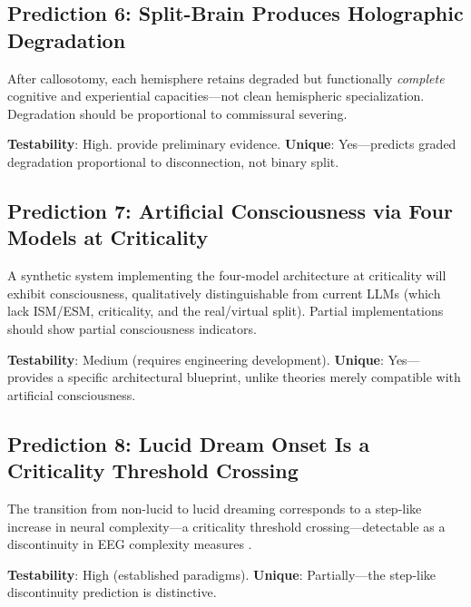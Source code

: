 \documentclass[12pt]{article}
\begin{document}
\subsection{Prediction 6: Split-Brain Produces Holographic Degradation}

After callosotomy, each hemisphere retains degraded but functionally \emph{complete} cognitive and experiential capacities---\hspace{0pt}not clean hemispheric specialization. Degradation should be proportional to commissural severing.

\textbf{Testability}: High. \citet{Pinto2017} provide preliminary evidence. \textbf{Unique}: Yes---\hspace{0pt}predicts graded degradation proportional to disconnection, not binary split.


\subsection{Prediction 7: Artificial Consciousness via Four Models at Criticality}

A synthetic system implementing the four-model architecture at criticality will exhibit consciousness, qualitatively distinguishable from current LLMs (which lack ISM/ESM, criticality, and the real/virtual split). Partial implementations should show partial consciousness indicators.

\textbf{Testability}: Medium (requires engineering development). \textbf{Unique}: Yes---\hspace{0pt}provides a specific architectural blueprint, unlike theories merely compatible with artificial consciousness.


\subsection{Prediction 8: Lucid Dream Onset Is a Criticality Threshold Crossing}

The transition from non-lucid to lucid dreaming corresponds to a step-like increase in neural complexity---\hspace{0pt}a criticality threshold crossing---\hspace{0pt}detectable as a discontinuity in EEG complexity measures \citep{LaBerge1985}.

\textbf{Testability}: High (established paradigms). \textbf{Unique}: Partially---\hspace{0pt}the step-like discontinuity prediction is distinctive.
\end{document}
